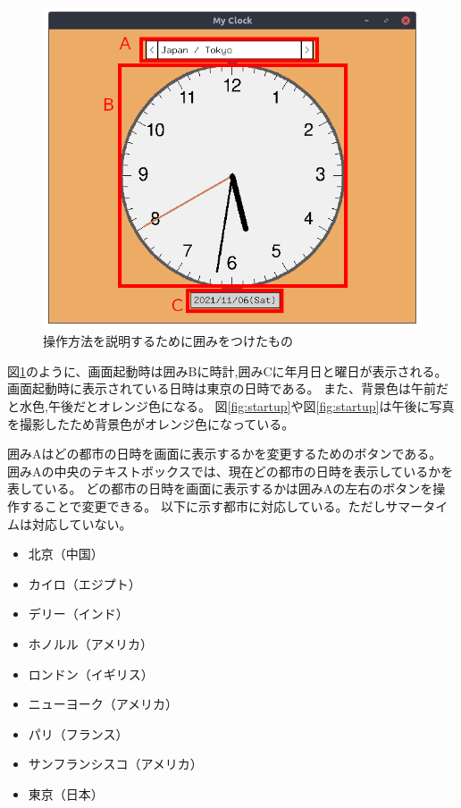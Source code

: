 \documentclass[a4paper,11pt]{jsarticle}
\begin{document}
    \begin{figure}[H]
      \centering
      \includegraphics[scale=0.3]{./src/startup_control.png}
      \caption{操作方法を説明するために囲みをつけたもの}
      \label{fig:startup-control}
    \end{figure}

    図\ref{fig:startup-control}のように、画面起動時は囲みBに時計,囲みCに年月日と曜日が表示される。
    画面起動時に表示されている日時は東京の日時である。
    また、背景色は午前だと水色,午後だとオレンジ色になる。
    図\ref{fig:startup}や図\ref{fig:startup}は午後に写真を撮影したため背景色がオレンジ色になっている。

    囲みAはどの都市の日時を画面に表示するかを変更するためのボタンである。
    囲みAの中央のテキストボックスでは、現在どの都市の日時を表示しているかを表している。
    どの都市の日時を画面に表示するかは囲みAの左右のボタンを操作することで変更できる。
    以下に示す都市に対応している。ただしサマータイムは対応していない。

    \begin{itemize}
      \item 北京（中国）
      \item カイロ（エジプト）
      \item デリー（インド）
      \item ホノルル（アメリカ）
      \item ロンドン（イギリス）
      \item ニューヨーク（アメリカ）
      \item パリ（フランス）
      \item サンフランシスコ（アメリカ）
      \item 東京（日本）
    \end{itemize}
    
\end{document}
